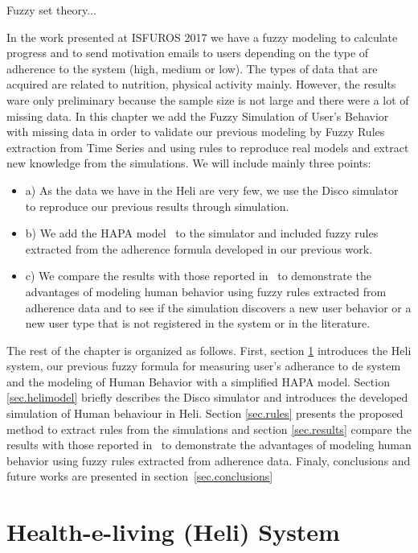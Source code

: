 \documentclass{llncs}
\begin{document}
Fuzzy set theory...
 
In the work presented at ISFUROS 2017 we have a fuzzy modeling to calculate progress and to send motivation emails to users depending on the type of adherence to the system (high, medium or low). The types of data that are acquired are related to nutrition, physical activity mainly. However, the results ware only preliminary because the sample size is not large and there were a lot of missing data. In this chapter we add the Fuzzy Simulation of User's Behavior with missing data in order to validate our previous modeling by Fuzzy Rules extraction from Time Series and using rules to reproduce real models and extract new knowledge from the simulations. We will include mainly three points:
\begin{itemize}
\item a) As the data we have in the Heli are very few, we use the Disco simulator~\cite{Disco} to reproduce our previous results through simulation.
\item b) We add the HAPA model~\cite{MacPhail} to the simulator and included fuzzy rules extracted from the adherence formula developed in our previous work.
\item c) We compare the results with those reported in~\cite{Brailsford2016} to demonstrate the advantages of modeling human behavior using fuzzy rules extracted from adherence data and to see if the simulation discovers a new user behavior or a new user type that is not registered in the system or in the literature.
\end{itemize}

The rest of the chapter is organized as follows. First, section \ref{sec.heli} introduces the Heli system, our previous fuzzy formula for measuring user's adherance to de system and the modeling of Human Behavior with a simplified HAPA model. Section \ref{sec.helimodel} briefly describes the Disco simulator and introduces the developed simulation of Human behaviour in Heli. Section \ref{sec.rules} presents the proposed method to extract rules from the simulations and section \ref{sec.results} compare the results with those reported in~\cite{Brailsford2016} to demonstrate the advantages of modeling human behavior using fuzzy rules extracted from adherence data. Finaly, conclusions and future works are presented in section~\ref{sec.conclusions}

\section{Health-e-living (Heli) System}
%
\label{sec.heli}
\end{document}
